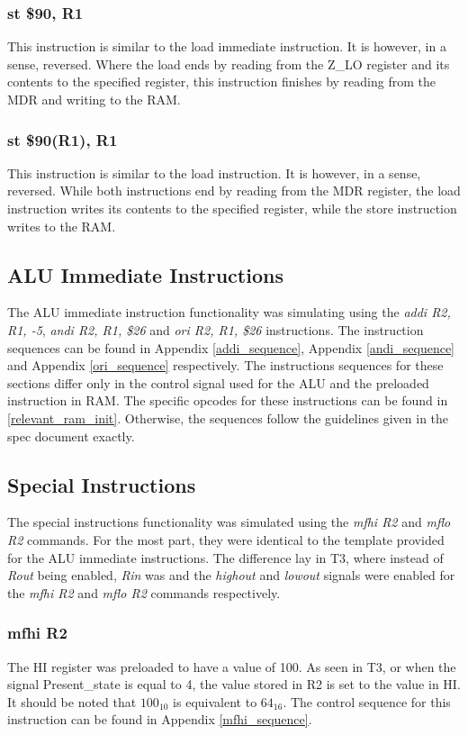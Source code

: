 \documentclass{article}
\begin{document}
            \subsubsection{st \$90, R1}
                This instruction is similar to the load immediate instruction. It is however, in a sense, reversed. Where the load ends by reading from the Z\_LO register and its contents to the specified register, this instruction finishes by reading from the MDR and writing to the RAM.
            \subsubsection{st \$90(R1), R1}
                This instruction is similar to the load instruction. It is however, in a sense, reversed. While both instructions end by reading from the MDR register, the load instruction writes its contents to the specified register, while the store instruction writes to the RAM.

        \subsection{ALU Immediate Instructions}
            The ALU immediate instruction functionality was simulating using the \emph{addi R2, R1, -5}, \emph{andi R2, R1, \$26} and \emph{ori R2, R1, \$26} instructions. The instruction sequences can be found in Appendix \ref{addi_sequence}, Appendix \ref{andi_sequence} and Appendix \ref{ori_sequence} respectively. The instructions sequences for these sections differ only in the control signal used for the ALU and the preloaded instruction in RAM. The specific opcodes for these instructions can be found in \ref{relevant_ram_init}. Otherwise, the sequences follow the guidelines given in the spec document exactly.


        \subsection{Special Instructions}
        The special instructions functionality was simulated using the \emph{mfhi R2} and \emph{mflo R2} commands. For the most part, they were identical to the template provided for the ALU immediate instructions. The difference lay in T3, where instead of \emph{Rout} being enabled, \emph{Rin} was and the \emph{highout} and \emph{lowout} signals were enabled for the \emph{mfhi R2} and \emph{mflo R2} commands respectively. 
        
            \subsubsection{mfhi R2}
                The HI register was preloaded to have a value of 100. As seen in T3, or when the signal Present\_state is equal to 4, the value stored in R2 is set to the value in HI. It should be noted that $100_{10}$ is equivalent to $64_{16}$. The control sequence for this instruction can be found in Appendix \ref{mfhi_sequence}.
\end{document}
